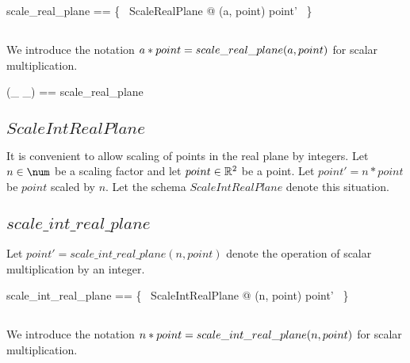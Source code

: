 \documentclass{amsart}
\begin{document}
\begin{zed}
	scale\_real\_plane == \{~ ScaleRealPlane @ (a, point) \mapsto point' ~\}
\end{zed}

\subsection{}

We introduce the notation $a \mathbin{*} point = scale\_real\_plane(a, point)$
for scalar multiplication.

\begin{zed}
	(\_ \smulRtwo \_) == scale\_real\_plane
\end{zed}

\subsection{$ScaleIntRealPlane$}

It is convenient to allow scaling of points in the real plane by integers.
Let $n \in \num$ be a scaling factor and let $point \in \mathbb{R}^2$ be a point.
Let $point' = n * point$ be  $point$ scaled by $n$.
Let the schema $ScaleIntRealPlane$ denote this situation.


\subsection{$scale\_int\_real\_plane$}

Let $point' = scale\_int\_real\_plane(n, point)$ denote the operation of scalar multiplication
by an integer.

\begin{zed}
	scale\_int\_real\_plane == \{~ ScaleIntRealPlane @ (n, point) \mapsto point' ~\}
\end{zed}

\subsection{}

We introduce the notation $n \mathbin{*} point = scale\_int\_real\_plane(n, point)$
for scalar multiplication.
\end{document}
